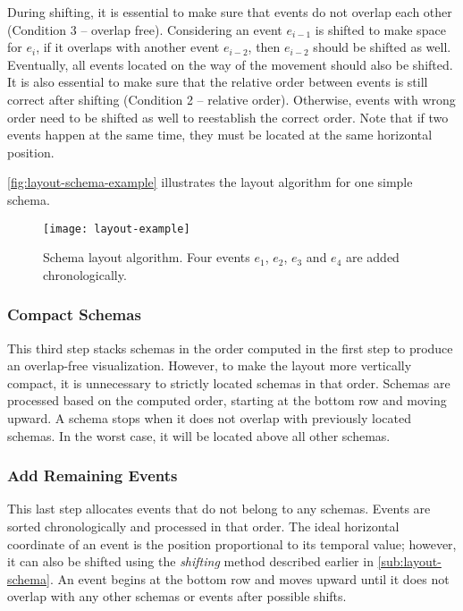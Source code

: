 During shifting, it is essential to make sure that events do not overlap each other (Condition 3 -- overlap free). Considering an event $e_{i-1}$ is shifted to make space for $e_i$, if it overlaps with another event $e_{i-2}$, then $e_{i-2}$ should be shifted as well. Eventually, all events located on the way of the movement should also be shifted. It is also essential to make sure that the relative order between events is still correct after shifting (Condition 2 -- relative order). Otherwise, events with wrong order need to be shifted as well to reestablish the correct order. Note that if two events happen at the same time, they must be located at the same horizontal position. 

\autoref{fig:layout-schema-example} illustrates the layout algorithm for one simple schema.

\begin{figure}[!htb]
	\centering
	\texttt{[image: layout-example]}
	\caption{Schema layout algorithm. Four events $e_1$, $e_2$, $e_3$ and $e_4$ are added chronologically.}
	\label{fig:layout-schema-example}
\end{figure}

\subsubsection{Compact Schemas}
This third step stacks schemas in the order computed in the first step to produce an overlap-free visualization. However, to make the layout more vertically compact, it is unnecessary to strictly located schemas in that order. Schemas are processed based on the computed order, starting at the bottom row and moving upward. A schema stops when it does not overlap with previously located schemas. In the worst case, it will be located above all other schemas.

\subsubsection{Add Remaining Events}
This last step allocates events that do not belong to any schemas. Events are sorted chronologically and processed in that order. The ideal horizontal coordinate of an event is the position proportional to its temporal value; however, it can also be shifted using the \emph{shifting} method described earlier in \autoref{sub:layout-schema}. An event begins at the bottom row and moves upward until it does not overlap with any other schemas or events after possible shifts. 

